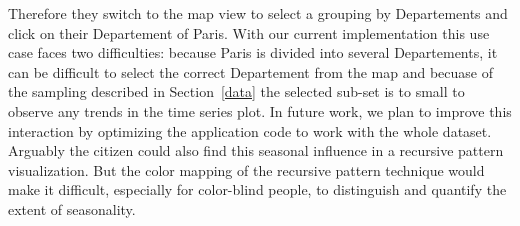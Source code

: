 Therefore they switch to the map view to select a grouping by Departements and click on their Departement of Paris. 
With our current implementation this use case faces two difficulties: \Ni because Paris is divided into several Departements, it can be difficult to select the correct Departement from the map and \Nii becuase of the sampling described in Section~\ref{data} the selected sub-set is to small to observe any trends in the time series plot.
In future work, we plan to improve this interaction by optimizing the application code to work with the whole dataset.
Arguably the citizen could also find this seasonal influence in a recursive pattern visualization. But the color mapping of the recursive pattern technique would make it difficult, especially for color-blind people, to distinguish and quantify the extent of seasonality.


